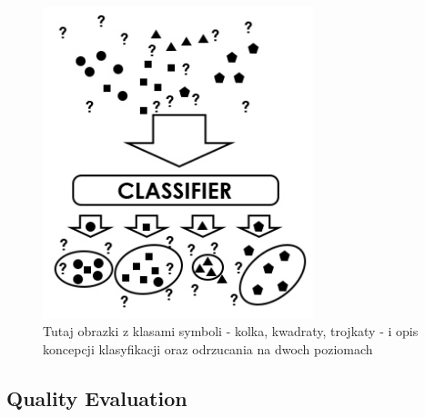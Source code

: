 \documentclass{llncs}
\begin{document}
\begin{figure}[!h]
	\centering
	\includegraphics[width=0.7\textwidth]{_Figures/Classification2.jpg}
	\caption{\color{red}Tutaj obrazki z klasami symboli - kolka, kwadraty, trojkaty - i opis koncepcji klasyfikacji oraz odrzucania na dwoch poziomach}
	\label{fig:nativeforeignpatternsClassification2}
\end{figure}


\subsection{Quality Evaluation}
\end{document}
